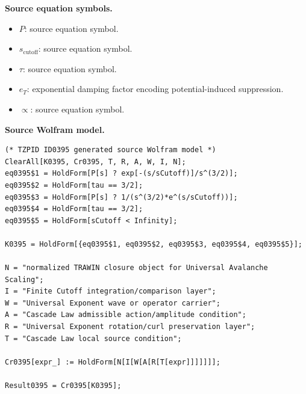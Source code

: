 \begin{minipage}[t]{0.49\linewidth}
\begingroup
\small
\raggedright
\textbf{Source equation symbols.}\par
\begin{itemize}[leftmargin=1.35em,itemsep=1pt,topsep=1pt,parsep=0pt]
    \item $P$: source equation symbol.
    \item $s_{\mathrm{cutoff}}$: source equation symbol.
    \item $\tau$: source equation symbol.
    \item $e_T$: exponential damping factor encoding potential-induced suppression.
    \item $\propto$: source equation symbol.
\end{itemize}
\endgroup
\end{minipage}\hfill
\begin{minipage}[t]{0.47\linewidth}
\begingroup
\scriptsize
\raggedright
\textbf{Source Wolfram model.}\par
\begin{Verbatim}[fontsize=\tiny,breaklines=true,breakanywhere=true]
(* TZPID ID0395 generated source Wolfram model *)
ClearAll[K0395, Cr0395, T, R, A, W, I, N];
eq0395$1 = HoldForm[P[s] ? exp[-(s/sCutoff)]/s^(3/2)];
eq0395$2 = HoldForm[tau == 3/2];
eq0395$3 = HoldForm[P[s] ? 1/(s^(3/2)*e^(s/sCutoff))];
eq0395$4 = HoldForm[tau == 3/2];
eq0395$5 = HoldForm[sCutoff < Infinity];

K0395 = HoldForm[{eq0395$1, eq0395$2, eq0395$3, eq0395$4, eq0395$5}];

N = "normalized TRAWIN closure object for Universal Avalanche Scaling";
I = "Finite Cutoff integration/comparison layer";
W = "Universal Exponent wave or operator carrier";
A = "Cascade Law admissible action/amplitude condition";
R = "Universal Exponent rotation/curl preservation layer";
T = "Cascade Law local source condition";

Cr0395[expr_] := HoldForm[N[I[W[A[R[T[expr]]]]]]];

Result0395 = Cr0395[K0395];
\end{Verbatim}
\endgroup
\end{minipage}

